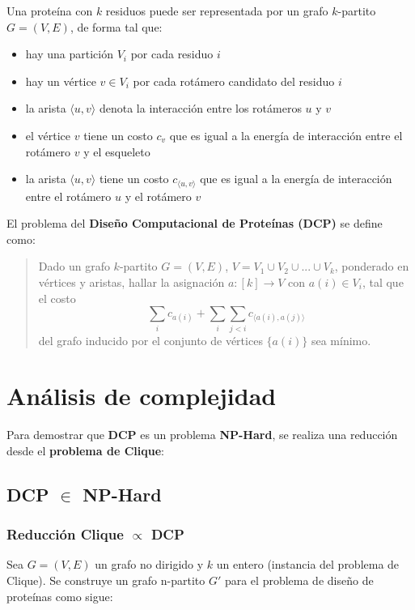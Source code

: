 \documentclass[letterpaper, 12pt]{report}
\begin{document}
Una proteína con $k$ residuos puede ser representada por un grafo $k$-partito $G = (V,E)$, de forma tal que:
\begin{itemize}
    \item hay una partición $V_i$ por cada residuo $i$
    \item hay un vértice $v \in V_i$ por cada rotámero candidato del residuo $i$
    \item la arista $\langle u,v \rangle$ denota la interacción entre los rotámeros $u$ y $v$
    \item el vértice $v$ tiene un costo $c_v$ que es igual a la energía de interacción entre el rotámero $v$ y el esqueleto
    \item la arista $\langle u,v \rangle$ tiene un costo $c_{ \langle u,v \rangle }$ que es igual a la energía de interacción entre el rotámero $u$ y el rotámero $v$ \\
\end{itemize}

El problema del \textbf{Dise\~no Computacional de Proteínas (DCP)} se define como:

\begin{quote}
    Dado un grafo $k$-partito $G = (V,E)$, $V = V_1 \cup V_2 \cup ... \cup V_k$, ponderado en vértices y aristas, hallar la asignaci\'on $a: [k] \rightarrow V$ con $a(i) \in V_i$, tal que 
    el costo 
    \[\sum_i c_{a(i)} + \sum_i \sum_{j<i} c_{ \langle a(i),a(j) \rangle }  \]
    del grafo inducido por el conjunto de vértices $ \lbrace a(i) \rbrace $ sea m\'inimo.
\end{quote}


\chapter{An\'alisis de complejidad}


Para demostrar que \textbf{DCP} es un problema \textbf{NP-Hard}, se realiza una reducción desde el \textbf{problema de Clique}:

\section{DCP $\in$ NP-Hard}

\subsection{Reducción Clique $\propto$ DCP}

Sea $ G = (V, E) $ un grafo no dirigido y $ k $ un entero (instancia del problema de Clique). Se construye un grafo n-partito $ G' $ para el problema de diseño de proteínas como sigue:
\end{document}

